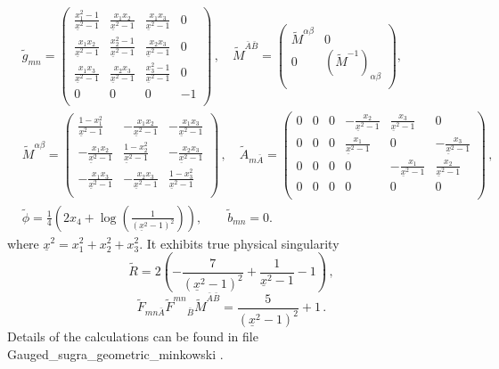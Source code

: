 \documentclass[12pt, utf8]{article}
\numberwithin{equation}{section}
\begin{document}
\begin{equation}
    \begin{aligned}
    &    \tilde{g}_{m n} = \left(
\begin{array}{cccc}
 \frac{x_1^2-1}{\underline{x}^2-1} & \frac{x_1 x_2}{\underline{x}^2-1} & \frac{x_1 x_3}{\underline{x}^2-1} & 0 \\
 \frac{x_1 x_2}{\underline{x}^2-1} & \frac{x_2^2-1}{\underline{x}^2-1} & \frac{x_2 x_3}{\underline{x}^2-1} & 0 \\
 \frac{x_1 x_3}{\underline{x}^2-1} & \frac{x_2 x_3}{\underline{x}^2-1} & \frac{x_3^2-1}{\underline{x}^2-1} & 0 \\
 0 & 0 & 0 & -1 \\
\end{array}
\right) \, , \quad \tilde{M}^{\bar{A}\bar{B}} = 
\left(
\begin{array}{cc}
 \tilde{M}^{\alpha \beta} & 0  \\
 0 & (\tilde{M}^{-1})_{\alpha \beta} \\
\end{array}
\right), \\
&\tilde{M}^{\alpha \beta} = 
\left(
\begin{array}{ccc}
 \frac{1-x_1^2}{\underline{x}^2-1} & -\frac{x_1 x_2}{\underline{x}^2-1} & -\frac{x_1 x_3}{\underline{x}^2-1} \\
 -\frac{x_1 x_2}{\underline{x}^2-1} & \frac{1-x_2^2}{\underline{x}^2-1} & -\frac{x_2 x_3}{\underline{x}^2-1} \\
 -\frac{x_1 x_3}{\underline{x}^2-1} & -\frac{x_2 x_3}{\underline{x}^2-1} & \frac{1-x_3^2}{\underline{x}^2-1} \\
\end{array}
\right)
 \, , \quad  \tilde{A}_{m \bar{A}} = \left(
\begin{array}{cccccc}
 0 & 0 & 0 & -\frac{x_2}{\underline{x}^2-1} & \frac{x_3}{\underline{x}^2-1} & 0 \\
 0 & 0 & 0 & \frac{x_1}{\underline{x}^2-1} & 0 & -\frac{x_3}{\underline{x}^2-1} \\
 0 & 0 & 0 & 0 & -\frac{x_1}{\underline{x}^2-1} & \frac{x_2}{\underline{x}^2-1} \\
 0 & 0 & 0 & 0 & 0 & 0 \\
\end{array}
\right)\, ,\\
& \tilde{\phi} = \frac{1}{4} \left(2 x_4+\log \left(\frac{1}{\left(\underline{x}^2-1\right)^2}\right)\right), \qquad \tilde{b}_{mn} = 0.
    \end{aligned}
\end{equation}
where  $ \underline{x}^2 = x_1^2+x_2^2+x_3^2$. It exhibits true physical singularity
\begin{equation}
    \tilde{R} = 2 \left(-\frac{7}{\left(\underline{x}^2-1\right)^2}+\frac{1}{\underline{x}^2-1}-1\right) \, , 
\end{equation}
\begin{equation}
  \tilde{F}_{m n \bar{A}} \tilde{F}^{m n}{}_{\bar{B}} \tilde{M}^{\bar{A} \bar{B}}  =\frac{5}{\left(\underline{x}^2-1\right)^2}+1 \, .
\end{equation}
Details of the calculations can be found in file Gauged\_sugra\_geometric\_minkowski \cite{Gubarev:2025nonabelianuni}.
\end{document}
